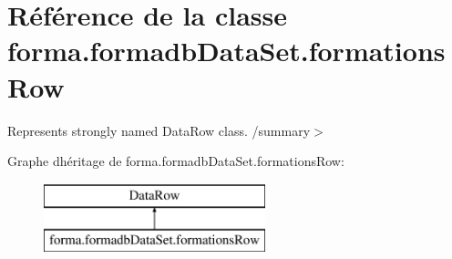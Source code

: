 \hypertarget{classforma_1_1formadb_data_set_1_1formations_row}{}\section{Référence de la classe forma.\+formadb\+Data\+Set.\+formations\+Row}
\label{classforma_1_1formadb_data_set_1_1formations_row}


Represents strongly named Data\+Row class. /summary$>$  


Graphe d\textquotesingle{}héritage de forma.\+formadb\+Data\+Set.\+formations\+Row\+:\begin{figure}[H]
\begin{center}
\leavevmode
\includegraphics[height=2.000000cm]{classforma_1_1formadb_data_set_1_1formations_row}
\end{center}
\end{figure}
